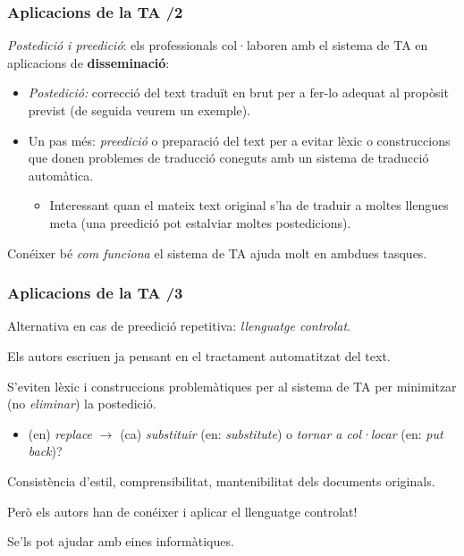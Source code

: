 \documentclass{beamer}
\newcommand{\empha}[1]{\emph{#1}\/}
\begin{document}
\begin{frame}
\frametitle{ Aplicacions de la TA /2}

\empha{Postedició i preedició}: els professionals col·laboren amb el
  sistema de TA en aplicacions de \textbf{disseminació}:
\begin{itemize}
\item\empha{Postedició:} correcció del text traduït en brut
  per a fer-lo adequat al propòsit previst (de seguida veurem un exemple).
\item Un pas més: \empha{preedició} o preparació del text per a evitar
  lèxic o construccions que donen problemes de traducció coneguts amb un
  sistema de traducció automàtica. 
  \begin{itemize}
  \item Interessant quan el mateix text original s'ha de traduir a moltes llengues meta (una preedició pot estalviar moltes postedicions).

  \end{itemize}
\end{itemize}

  Conéixer bé \empha{com funciona} el sistema de TA ajuda molt en
  ambdues tasques.

\end{frame}


\begin{frame}
\frametitle{ Aplicacions de la TA /3}

{ {Alternativa en cas de preedició repetitiva: \empha{llenguatge
      controlat}.}
\begin{itemize}\setlength{\itemsep}{0pt}
{\item Els autors escriuen ja pensant en el tractament automatitzat
  del text.}
{\item S'eviten lèxic i construccions problemàtiques per al sistema de TA per minimitzar (no \empha{eliminar}) la postedició.
  \begin{itemize}
  \item (en) \empha{replace} \(\to\) (ca) \empha{substituir} (en: \empha{substitute}) o \empha{tornar a col·locar} (en: \empha{put back})?
  \end{itemize}

}
{\item Consistència d'estil, comprensibilitat, mantenibilitat dels documents originals.}
{\item Però els autors han de conéixer i aplicar el llenguatge controlat!}
{\item Se'ls pot ajudar amb eines informàtiques.}
\end{itemize}
}
\end{frame}
\end{document}
